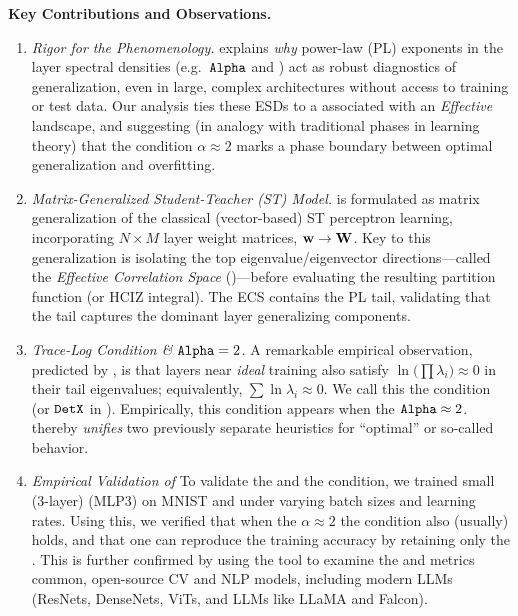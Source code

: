 \vspace{1em}
\noindent
\textbf{Key Contributions and Observations.}
\begin{enumerate}[label=\Alph*.]
\item 
\emph{Rigor for the \HTSR Phenomenology.}
\SETOL explains \emph{why} power-law (PL) exponents in the layer spectral densities (e.g.\ $\texttt{Alpha}$ and 
\ALPHAHAT) act as robust diagnostics of generalization, even in large, complex architectures without access 
to training or test data. Our analysis ties these \HeavyTailed ESDs to a \VolumePreservingTransformation
associated with an \emph{Effective} \FreeEnergy landscape, and
suggesting (in analogy with traditional \STATMECH phases in learning theory)
that the \HTSR condition $\alpha\approx 2$ marks a
phase boundary between optimal generalization and overfitting.

\item 
\emph{Matrix-Generalized Student-Teacher (ST) Model.}
\SETOL is formulated as matrix generalization of
the classical (vector-based) ST perceptron learning, incorporating $N\times M$ layer 
weight matrices, ${\mathbf{w}}\rightarrow{\mathbf{W}}$.
Key to this generalization is isolating the top eigenvalue/eigenvector directions---called the
\emph{Effective Correlation Space} (\ECS)---before evaluating the resulting partition function (or HCIZ 
integral). The ECS contains the \HTSR PL tail, validating that the tail captures the dominant layer generalizing components.

\item 
\emph{Trace-Log Condition \& $\texttt{Alpha}=2$.}
A remarkable empirical observation, predicted by \SETOL, is that layers near \emph{ideal} training also satisfy 
$\ln\!\bigl(\prod \lambda_i \bigr) \approx 0$ in their tail eigenvalues; equivalently, $\sum \ln\lambda_i \approx 0$.
We call this the \TRACELOG condition (or $\texttt{DetX}$ in \WW).
Empirically, this condition appears when the \HTSR $\texttt{Alpha} \approx 2$. \SETOL thereby \emph{unifies} two 
previously separate heuristics for “optimal” or so-called \Ideal  behavior.

\item 
  \emph{Empirical Validation of \SETOL}
To validate the \ECS and the \TRACELOG condition, we trained small (3-layer) \MultiLayerPerceptron (MLP3)
on MNIST and under varying batch sizes and learning rates.  Using this, we verified that
when the \HTSR $\alpha\approx 2$ the \SETOL \TRACELOG condition also (usually) holds,
and that one can reproduce the training accuracy by retaining only the \ECS.
This is further confirmed by using the \WW tool to examine the \ALPHA and \DETX metrics
common, open-source CV and NLP  models, including modern LLMs 
(ResNets, DenseNets,    ViTs, and LLMs like LLaMA and Falcon).


\end{enumerate}
